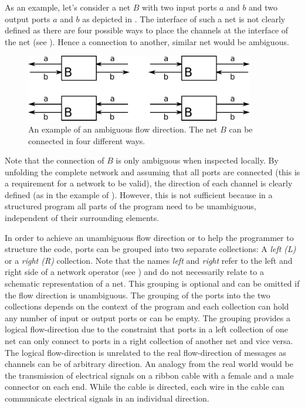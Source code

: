 As an example, let's consider a net $B$ with two input ports $a$ and $b$ and two output ports $a$ and $b$ as depicted in \Fig{\ref{fig_smx_box_dir}}.
The interface of such a net is not clearly defined as there are four possible ways to place the channels at the interface of the net (see \Fig{\ref{fig_smx_ambiguous}}).
Hence a connection to another, similar net would be ambiguous.
\begin{figure}[bht]\begin{center}
    \TopFigSpace
    \includegraphics[width=10cm]{fig/ambiguous.pdf}
    \CaptionFigSpace
    \caption{An example of an ambiguous flow direction. The net $B$ can be connected in four different ways.}
    \label{fig_smx_ambiguous}
    \BotFigSpace
\end{center}\end{figure}

Note that the connection of $B$ is only ambiguous when inspected locally.
By unfolding the complete network and assuming that all ports are connected (this is a requirement for a network to be valid), the direction of each channel is clearly defined (as in the example of \Fig{\ref{fig_smx_box_dir}}).
However, this is not sufficient because in a structured program all parts of the program need to be unambiguous, independent of their surrounding elements.

In order to achieve an unambiguous flow direction or to help the programmer to structure the code, ports can be grouped into two separate collections:
A \emph{left (L)} or a \emph{right (R)} collection.
Note that the names \emph{left} and \emph{right} refer to the left and right side of a network operator (see \Sect{\ref{sect_smx_network}}) and do not necessarily relate to a schematic representation of a net.
This grouping is optional and can be omitted if the flow direction is unambiguous.
The grouping of the ports into the two collections depends on the context of the program and each collection can hold any number of input or output ports or can be empty.
The grouping provides a logical flow-direction due to the constraint that ports in a left collection of one net can only connect to ports in a right collection of another net and vice versa.
The logical flow-direction is unrelated to the real flow-direction of messages as channels can be of arbitrary direction.
An analogy from the real world would be the transmission of electrical signals on a ribbon cable with a female and a male connector on each end.
While the cable is directed, each wire in the cable can communicate electrical signals in an individual direction.

